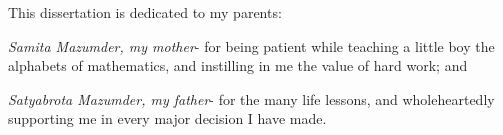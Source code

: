 This dissertation is dedicated to my parents:

\vspace{1em}
\noindent \textit{Samita Mazumder, my mother}- for being patient while teaching a little boy the alphabets of mathematics, and instilling in me the value of hard work; and

\vspace{1em}
\noindent \textit{Satyabrota Mazumder, my father}- for the many life lessons, and wholeheartedly supporting me in every major decision I have made.
